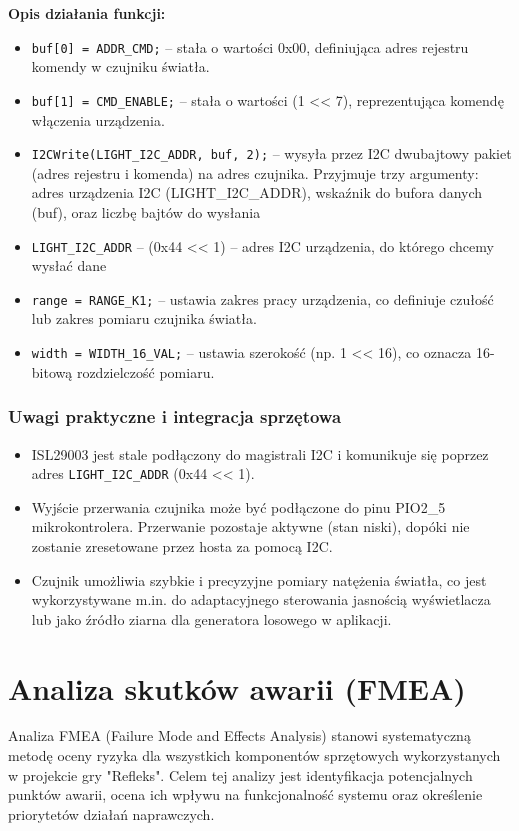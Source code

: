 \documentclass[letterpaper,11pt]{report}
\begin{document}
\textbf{Opis działania funkcji:}
\begin{itemize}
    \item \texttt{buf[0] = ADDR\_CMD;} – stała o wartości 0x00, definiująca adres rejestru komendy w czujniku światła.
    \item \texttt{buf[1] = CMD\_ENABLE;} – stała o wartości (1 << 7), reprezentująca komendę włączenia urządzenia.
    \item \texttt{I2CWrite(LIGHT\_I2C\_ADDR, buf, 2);} – wysyła przez I2C dwubajtowy pakiet (adres rejestru i komenda) na adres czujnika. Przyjmuje trzy argumenty: adres urządzenia I2C (LIGHT\_I2C\_ADDR), wskaźnik do bufora danych (buf), oraz liczbę bajtów do wysłania
    \item \texttt{LIGHT\_I2C\_ADDR} – (0x44 << 1) – adres I2C urządzenia, do którego chcemy wysłać dane
    \item \texttt{range = RANGE\_K1;} – ustawia zakres pracy urządzenia, co definiuje czułość lub zakres pomiaru czujnika światła.
    \item \texttt{width = WIDTH\_16\_VAL;} – ustawia szerokość (np. 1 << 16), co oznacza 16-bitową rozdzielczość pomiaru.
\end{itemize}

\subsection*{Uwagi praktyczne i integracja sprzętowa}

\begin{itemize}
    \item ISL29003 jest stale podłączony do magistrali I2C i komunikuje się poprzez adres \texttt{LIGHT\_I2C\_ADDR} (0x44 << 1).
    \item Wyjście przerwania czujnika może być podłączone do pinu PIO2\_5 mikrokontrolera. Przerwanie pozostaje aktywne (stan niski), dopóki nie zostanie zresetowane przez hosta za pomocą I2C.
    \item Czujnik umożliwia szybkie i precyzyjne pomiary natężenia światła, co jest wykorzystywane m.in. do adaptacyjnego sterowania jasnością wyświetlacza lub jako źródło ziarna dla generatora losowego w aplikacji.
\end{itemize}

\chapter{Analiza skutków awarii (FMEA)}

Analiza FMEA (Failure Mode and Effects Analysis) stanowi systematyczną metodę oceny ryzyka dla wszystkich komponentów sprzętowych wykorzystanych w projekcie gry "Refleks". Celem tej analizy jest identyfikacja potencjalnych punktów awarii, ocena ich wpływu na funkcjonalność systemu oraz określenie priorytetów działań naprawczych.
\end{document}

